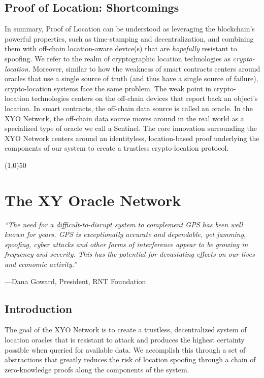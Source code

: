 \documentclass{article}
\begin{document}
\subsection {Proof of Location: Shortcomings}

In summary, Proof of Location can be understood as leveraging the blockchain's powerful properties, such as time-stamping and decentralization, and combining them with off-chain location-aware device(s) that are \textit{hopefully} resistant to spoofing. We refer to the realm of cryptographic location technologies as \textit{crypto-location}. Moreover, similar to how the weakness of smart contracts centers around oracles that use a single source of truth (and thus have a single source of failure), crypto-location systems face the same problem. The weak point in crypto-location technologies centers on the off-chain devices that report back an object's location. In smart contracts, the off-chain data source is called an oracle. In the XYO Network, the off-chain data source moves around in the real world as a specialized type of oracle we call a Sentinel. The core innovation surrounding the XYO Network centers around an identityless, location-based proof underlying the components of our system to create a trustless crypto-location protocol.
\begin{center}
\line(1,0){50}
\end{center}

\section {The XY Oracle Network}

\begin{displayquote}\textit{``The need for a difficult-to-disrupt system to complement GPS has been well known for years. GPS is exceptionally accurate and dependable, yet jamming, spoofing, cyber attacks and other forms of interference appear to be growing in frequency and severity. This has the potential for devastating effects on our lives and economic activity.''}

\vspace{2mm}
---Dana Goward, President, RNT Foundation
\end{displayquote}

\subsection{Introduction}
The goal of the XYO Network is to create a trustless, decentralized system of location oracles that is resistant to attack and produces the highest certainty possible when queried for available data. We accomplish this through a set of abstractions that greatly reduces the risk of location spoofing through a chain of zero-knowledge proofs along the components of the system.
\end{document}
